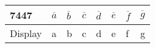 \begin{tabular}{|p{1cm}|p{0.5cm}|p{0.5cm}|p{0.5cm}|p{0.5cm}|p{0.5cm}|p{0.5cm}|p{0.5cm}|}                            
\hline                                         
7447& $\overline{a}$ & $\overline{b}$ & $\overline{c}$ & $\overline{d}$ & $\overline{e}$ & $\overline{f}$ & $\overline{g}$\\          
\hline                                          
Display& a& b& c& d& e& f& g\\         
\hline                                        
\end{tabular}
